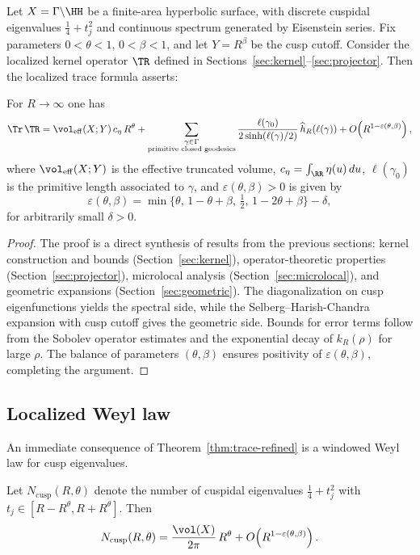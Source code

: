 Let $X=\Gamma\backslash\HH$ be a finite-area hyperbolic surface, with discrete cuspidal eigenvalues $\tfrac14+t_j^2$ and continuous spectrum generated by Eisenstein series. Fix parameters $0<\theta<1$, $0<\beta<1$, and let $Y=R^\beta$ be the cusp cutoff. Consider the localized kernel operator $\TR$ defined in Sections~\ref{sec:kernel}--\ref{sec:projector}. Then the localized trace formula asserts:

\begin{theorem}\label{thm:trace-refined}
For $R\to\infty$ one has
\[
\Tr\,\TR
= \vol_{\mathrm{eff}}(X;Y)\,c_\eta\,R^\theta
+ \sum_{\substack{\gamma\in \Gamma \\ \text{primitive closed geodesics}}}
\frac{\ell(\gamma_0)}{2\sinh(\ell(\gamma)/2)}
\, \widehat{h}_R(\ell(\gamma)) 
+ O\!\left(R^{1-\varepsilon(\theta,\beta)}\right),
\]
where $\vol_{\mathrm{eff}}(X;Y)$ is the effective truncated volume, $c_\eta=\int_\RR \eta(u)\,du$, $\ell(\gamma_0)$ is the primitive length associated to $\gamma$, and $\varepsilon(\theta,\beta)>0$ is given by
\[
\varepsilon(\theta,\beta)=\min\{\theta,\,1-\theta+\beta,\,\tfrac12,\,1-2\theta+\beta\}-\delta,
\]
for arbitrarily small $\delta>0$.
\end{theorem}

\begin{proof}
The proof is a direct synthesis of results from the previous sections: kernel construction and bounds (Section~\ref{sec:kernel}), operator-theoretic properties (Section~\ref{sec:projector}), microlocal analysis (Section~\ref{sec:microlocal}), and geometric expansions (Section~\ref{sec:geometric}). The diagonalization on cusp eigenfunctions yields the spectral side, while the Selberg--Harish-Chandra expansion with cusp cutoff gives the geometric side. Bounds for error terms follow from the Sobolev operator estimates and the exponential decay of $k_R(\rho)$ for large $\rho$. The balance of parameters $(\theta,\beta)$ ensures positivity of $\varepsilon(\theta,\beta)$, completing the argument.
\end{proof}

\subsection{Localized Weyl law}\label{subsec:weyl-law}

An immediate consequence of Theorem~\ref{thm:trace-refined} is a windowed Weyl law for cusp eigenvalues.

\begin{corollary}\label{cor:weyl-law}
Let $N_{\mathrm{cusp}}(R,\theta)$ denote the number of cuspidal eigenvalues $\tfrac14+t_j^2$ with $t_j\in [R-R^\theta,R+R^\theta]$. Then
\[
N_{\mathrm{cusp}}(R,\theta) = \frac{\vol(X)}{2\pi}\,R^\theta + O\!\left(R^{1-\varepsilon(\theta,\beta)}\right).
\]
\end{corollary}

